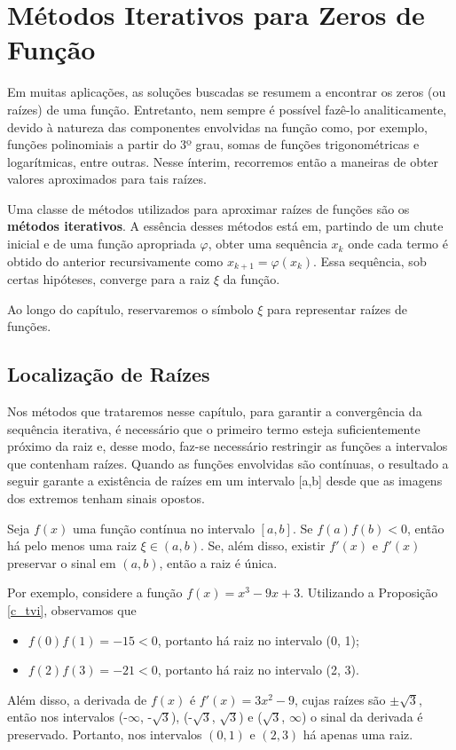 \chapter{Métodos Iterativos para Zeros de Função}

Em muitas aplicações, as soluções buscadas se resumem a encontrar os zeros (ou raízes) de uma função. Entretanto, nem sempre é possível fazê-lo analiticamente, devido à natureza das componentes envolvidas na função como, por exemplo, funções polinomiais a partir do 3º grau, somas de funções trigonométricas e logarítmicas, entre outras. Nesse ínterim, recorremos então a maneiras de obter valores aproximados para tais raízes. 

Uma classe de métodos utilizados para aproximar raízes de funções são os \textbf{métodos iterativos}. A essência desses métodos está em, partindo de um chute inicial e de uma função apropriada $\varphi$, obter uma sequência $x_k$ onde cada termo é obtido do anterior recursivamente como $x_{k+1} = \varphi(x_k)$. Essa sequência, sob certas hipóteses, converge para a raiz $\xi$ da função.


Ao longo do capítulo, reservaremos o símbolo $\xi$ para representar raízes de funções.

\section{Localização de Raízes}

Nos métodos que trataremos nesse capítulo, para garantir a convergência da sequência iterativa, é necessário que o primeiro termo esteja suficientemente próximo da raiz e, desse modo, faz-se necessário restringir as funções a intervalos que contenham raízes. Quando as funções envolvidas são contínuas, o resultado a seguir garante a existência de raízes em um intervalo [a,b] desde que as imagens dos extremos tenham sinais opostos.

\begin{prop}\label{c_tvi}%
Seja $f(x)$ uma função contínua no intervalo $[a, b]$. Se $f(a)f(b) < 0$, então há pelo menos uma raiz $\xi \in (a,b)$. Se, além disso, existir $f'(x)$ e $f'(x)$ preservar o sinal em $(a,b)$, então a raiz é única.
\end{prop} %
Por exemplo, considere a função $f(x) = x^3 - 9x + 3$. Utilizando a Proposição \ref{c_tvi}, observamos que
\begin{itemize}
    \item $f(0)f(1) = -15 < 0$, portanto há raiz no intervalo (0, 1);
    \item $f(2)f(3) = -21 < 0$, portanto há raiz no intervalo (2, 3).
\end{itemize}
Além disso, a derivada de $f(x)$ é $f'(x) = 3x^2 - 9$, cujas raízes são $\pm \sqrt{3}$, então nos intervalos (-$\infty$, -$\sqrt{3}$), (-$\sqrt{3}$, $\sqrt{3}$) e ($\sqrt{3}$, $\infty$) o sinal da derivada é preservado. Portanto, nos intervalos $(0, 1)$ e $(2, 3)$ há apenas uma raiz.

